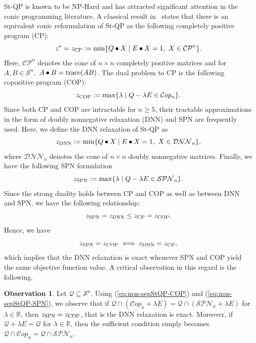 \documentclass{amsart}
\def\trace{\mathop{\rm trace}}
\newcommand{\cS}{\mathcal{S}}
\newcommand{\cQ}{\mathcal{Q}}
\newcommand{\Cop}{\mathcal{C}op}
\newcommand{\SPN}{\mathcal{SPN}}
\newcommand{\DNN}{\mathcal{DNN}}
\newcommand{\CP}{\mathcal{CP}}
\theoremstyle{definition}
\newtheorem{observation}[theorem]{Observation}
\begin{document}
St-QP is known to be NP-Hard and has attracted significant attention in the conic programming literature. %
A classical result in~\cite{burer2009copositive} states that there is an equivalent conic reformulation of St-QP as the following completely positive program (CP):
\begin{equation*}\label{eq:non-sepStQP-CP}
  z^* =  z_{\textup{CP}} :=   \min \{  Q \bullet X  \;\vert\; E \bullet X = 1, \ X \in  \CP^n\}.
\end{equation*}
Here, $\CP^n$ denotes the cone of $n\times n$  completely positive matrices and for $A,B \in \cS^n,$ $A \bullet B = \trace(AB)$. The dual problem to CP is the following copositive program (COP):
\begin{equation}\label{eq:non-sepStQP-COP}
  z_{\textup{COP}} :=   \max \{  \lambda\;\vert\; Q- \lambda  E \in  \Cop_n\}.
\end{equation}
Since both CP and COP are intractable for $n\ge5$, their tractable approximations in the form of doubly nonnegative relaxation (DNN) and SPN are frequently used. Here, we define the DNN relaxation of St-QP as
\begin{equation*}\label{eq:non-sepStQP-DNN}
  z_{\textup{DNN}} :=   \min \{  Q \bullet X \;\vert\; E \bullet X = 1, \ X \in  \DNN_n\},
\end{equation*}
where $\DNN_n$ denotes the cone of $n\times n$ doubly nonnegative matrices. Finally, we have the following SPN formulation
\begin{equation}\label{eq:non-sepStQP-SPN}
  z_{\textup{SPN}} :=   \max \{  \lambda\;\vert\; Q- \lambda E  \in     \SPN_n\}. 
\end{equation}
Since the strong duality holds between CP and COP as well as between DNN and SPN, we have the following relationship:
\[
z_{\textup{SPN}} = z_{\textup{DNN}} \le z_{\textup{CP}} = z_{\textup{COP}}.
\]
Hence, we have
\[
z_{\textup{SPN}} = z_{\textup{COP}} \iff  z_{\textup{DNN}} = z_{\textup{CP}} ,
\]
which implies that the DNN relaxation is exact whenever SPN and COP yield the same objective function value. A critical observation in this regard is the following.
\begin{observation}\label{obs:mainObservation}
Let $\cQ\subseteq \cS^n$. Using (\ref{eq:non-sepStQP-COP}) and (\ref{eq:non-sepStQP-SPN}), we observe that if $\cQ \cap (\Cop_n + \lambda E)  =  \cQ \cap (\SPN_n + \lambda E) $ for $\lambda\in\mathbb{R}$, then $z_{\textup{SPN}} = z_{\textup{COP}}$, that is the DNN relaxation is exact. 
%
Moreover, if $\cQ + \lambda E =\cQ$ for $\lambda\in\mathbb{R}$, then the sufficient condition simply becomes  $\cQ \cap \Cop_n  =  \cQ \cap \SPN_n  $.
\end{observation}
\end{document}
